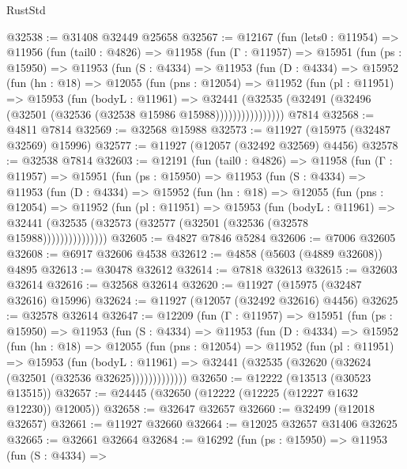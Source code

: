 \begin{lexlean}{RustStd}
\begin{coremodule}
@32538 := @31408 @32449 @25658
@32567 := @12167
    (fun (lets0 : @11954) =>
    @11956
      (fun (tail0 : @4826) =>
      @11958
        (fun (Γ : @11957) =>
        @15951
          (fun (ps : @15950) =>
          @11953
            (fun (S : @4334) =>
            @11953
              (fun (D : @4334) =>
              @15952
                (fun (hn : @18) =>
                @12055
                  (fun (pns : @12054) =>
                  @11952
                    (fun (pl : @11951) =>
                    @15953
                      (fun (bodyL : @11961) =>
                      @32441
                        (@32535
                          (@32491 (@32496 (@32501 (@32536 (@32538 @15986 @15988))))))))))))))))
    @7814
@32568 := @4811 @7814
@32569 := @32568 @15988
@32573 := @11927 (@15975 (@32487 @32569) @15996)
@32577 := @11927 (@12057 (@32492 @32569) @4456)
@32578 := @32538 @7814
@32603 := @12191
    (fun (tail0 : @4826) =>
    @11958
      (fun (Γ : @11957) =>
      @15951
        (fun (ps : @15950) =>
        @11953
          (fun (S : @4334) =>
          @11953
            (fun (D : @4334) =>
            @15952
              (fun (hn : @18) =>
              @12055
                (fun (pns : @12054) =>
                @11952
                  (fun (pl : @11951) =>
                  @15953
                    (fun (bodyL : @11961) =>
                    @32441 (@32535 (@32573 (@32577 (@32501 (@32536 (@32578 @15988)))))))))))))))
@32605 := @4827 @7846 @5284
@32606 := @7006 @32605
@32608 := @6917 @32606 @4538
@32612 := @4858 (@5603 (@4889 @32608)) @4895
@32613 := @30478 @32612
@32614 := @7818 @32613
@32615 := @32603 @32614
@32616 := @32568 @32614
@32620 := @11927 (@15975 (@32487 @32616) @15996)
@32624 := @11927 (@12057 (@32492 @32616) @4456)
@32625 := @32578 @32614
@32647 := @12209
    (fun (Γ : @11957) =>
    @15951
      (fun (ps : @15950) =>
      @11953
        (fun (S : @4334) =>
        @11953
          (fun (D : @4334) =>
          @15952
            (fun (hn : @18) =>
            @12055
              (fun (pns : @12054) =>
              @11952
                (fun (pl : @11951) =>
                @15953
                  (fun (bodyL : @11961) =>
                  @32441 (@32535 (@32620 (@32624 (@32501 (@32536 @32625)))))))))))))
@32650 := @12222 (@13513 (@30523 @13515))
@32657 := @24445 (@32650 (@12222 (@12225 (@12227 @1632 @12230)) @12005))
@32658 := @32647 @32657
@32660 := @32499 (@12018 @32657)
@32661 := @11927 @32660
@32664 := @12025 @32657 @31406 @32625
@32665 := @32661 @32664
@32684 := @16292
    (fun (ps : @15950) =>
    @11953
      (fun (S : @4334) =>

\end{coremodule}
\end{lexlean}

